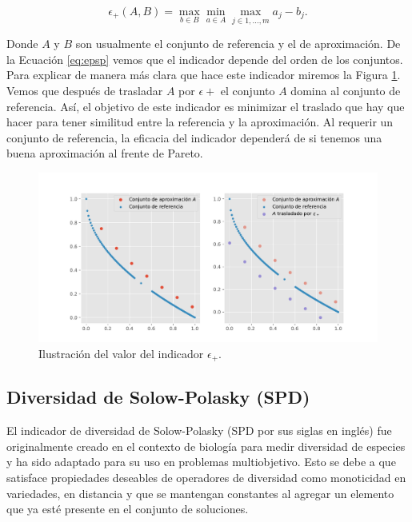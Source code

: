 \begin{equation} \label{eq:epsp}
    \epsilon_+(A,B)= \max_{b\in B} \min_{a\in A}\max_{j\in 1,\ldots, m} a_j-b_j. 
\end{equation}

Donde $A$ y $B$ son usualmente el conjunto de referencia y el de aproximación. De la Ecuación \ref{eq:epsp} vemos que el indicador depende del orden de los conjuntos.
Para explicar de manera más clara que hace este indicador miremos la Figura \ref{fig:epsp}. Vemos que después de trasladar $A$ por $\epsilon+$ el conjunto $A$ domina al conjunto de referencia. Así, el objetivo de este indicador es minimizar el traslado que hay que hacer para tener similitud entre la referencia y la aproximación. Al requerir un conjunto de referencia, la eficacia del indicador dependerá de si tenemos una buena aproximación al frente de Pareto. 

\begin{figure}[H]
    \centering
    \includegraphics[width=\textwidth]{Figuras/epsilon_plus_demo.pdf}
    \caption[$\epsilon+$]{Ilustración del valor del indicador $\epsilon_+$.}
    \label{fig:epsp}
\end{figure}

\subsection{Diversidad de Solow-Polasky (SPD)} \label{sec:SPD} 
El indicador de diversidad de Solow-Polasky (SPD por sus siglas en inglés) fue originalmente creado en el contexto de biología para medir diversidad de especies y ha sido adaptado para su uso en problemas multiobjetivo. Esto se debe a que satisface propiedades deseables de operadores de diversidad \cite{SPD} como monoticidad en variedades, en distancia y que se mantengan constantes al agregar un elemento que ya esté presente en el conjunto de soluciones.


